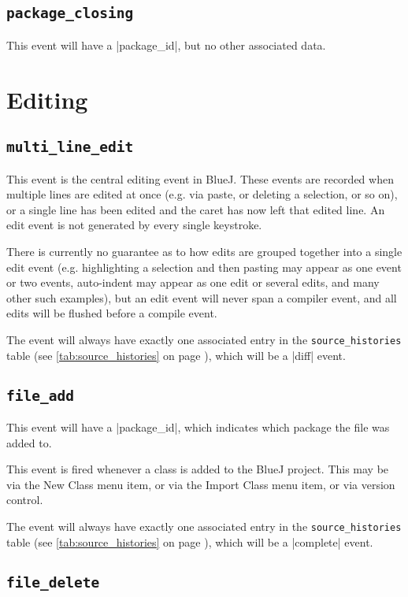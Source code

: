 \documentclass{book}
\newcommand{\myref}[1]{\autoref{#1} on page \pageref*{#1}}
\newcommand{\tabref}[1]{\lstinline|#1| table (see \myref{tab:#1})}
\begin{document}
\subsection{\lstinline|package_closing|}

This event will have a |package_id|, but no other associated data.


\section{Editing}

\subsection{\lstinline|multi_line_edit|}

This event is the central editing event in BlueJ.  These events are recorded
when multiple lines are edited at once (e.g. via paste, or deleting a
selection, or so on), or a single line has been edited and the caret
has now left that edited line.  An edit event is not generated by every single
keystroke.

There is currently no guarantee as to how edits are grouped together into a single edit
event (e.g. highlighting a selection and then pasting may appear as one event
or two events, auto-indent may appear as one edit or several edits, and many
other such examples), but an edit event will never span a compiler event, and
all edits will be flushed before a compile event.

The event will always have exactly one associated entry in the
\tabref{source_histories}, which will be a |diff| event.

\subsection{\lstinline|file_add|}

This event will have a |package_id|, which indicates which package the file
was added to.

This event is fired whenever a class is added to the BlueJ project.  This may
be via the New Class menu item, or via the Import Class menu item, or via
version control.

The event will always have exactly one associated entry in the
\tabref{source_histories}, which will be a |complete| event.

\subsection{\lstinline|file_delete|}
\end{document}
